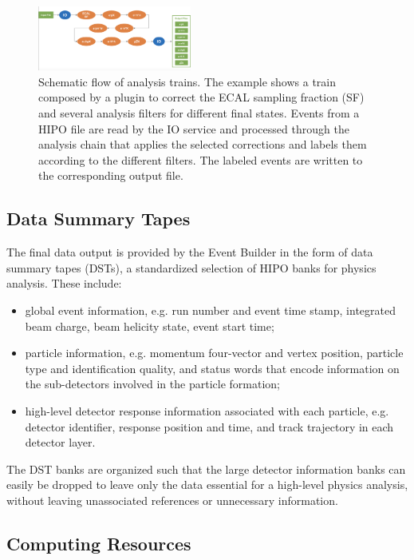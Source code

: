 \begin{figure}
    \includegraphics[width=0.45\textwidth,height=0.2\textheight]{pics/train.png}
    \caption{Schematic flow of analysis trains.  The example shows a train composed by a plugin to correct the ECAL sampling fraction (SF) and several analysis filters for different final states. Events from a HIPO file are read by the IO service and processed through the analysis chain that applies the selected corrections and labels them according to the different filters. The labeled events are written to the corresponding output file.\label{fig:train}}
\end{figure}

\subsection{Data Summary Tapes}
\label{sec:dsts}

The final data output is provided by the Event Builder in the form of data summary tapes (DSTs), a standardized
selection of HIPO banks for physics analysis. These include:

\begin{itemize}
\item global event information, e.g. run number and event time stamp, integrated beam charge, beam helicity state,
  event start time;
\item particle information, e.g. momentum four-vector and vertex position, particle type and identification quality,
  and status words that encode information on the sub-detectors involved in the particle formation;
\item high-level detector response information associated with each particle, e.g. detector identifier, response
  position and time, and track trajectory in each detector layer.
\end{itemize}

\noindent
The DST banks are organized such that the large detector information banks can easily be dropped to leave only
the data essential for a high-level physics analysis, without leaving unassociated references or unnecessary information.

\subsection{Computing Resources}

